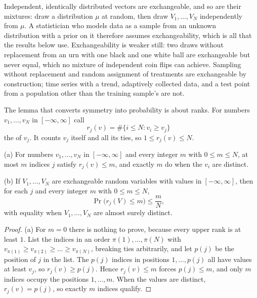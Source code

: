 \begin{refsection}
Independent, identically distributed vectors are exchangeable, and so are their mixtures: draw a distribution $\mu$ at random, then draw $V_1,\dots,V_N$ independently from $\mu$. A statistician who models data as a sample from an unknown distribution with a prior on it therefore assumes exchangeability, which is all that the results below use. Exchangeability is weaker still: two draws without replacement from an urn with one black and one white ball are exchangeable but never equal, which no mixture of independent coin flips can achieve. Sampling without replacement and random assignment of treatments are exchangeable by construction; time series with a trend, adaptively collected data, and a test point from a population other than the training sample's are not.

The lemma that converts symmetry into probability is about ranks. For numbers $v_1,\dots,v_N$ in $[-\infty,\infty]$ call
\[
r_j(v)=\#\{i\le N : v_i\ge v_j\}
\]
the  of $v_j$. It counts $v_j$ itself and all its ties, so $1\le r_j(v)\le N$.

\begin{lemma}\label{lem:conformal:rank}
\textup{(a)} For numbers $v_1,\dots,v_N$ in $[-\infty,\infty]$ and every integer $m$ with $0\le m\le N$, at most $m$ indices $j$ satisfy $r_j(v)\le m$, and exactly $m$ do when the $v_i$ are distinct.
\par\textup{(b)} If $V_1,\dots,V_N$ are exchangeable random variables with values in $[-\infty,\infty]$, then for each $j$ and every integer $m$ with $0\le m\le N$,
\[
\Pr\bigl(r_j(V)\le m\bigr)\le\frac{m}{N},
\]
with equality when $V_1,\dots,V_N$ are almost surely distinct.
\end{lemma}

\begin{proof}
(a) For $m=0$ there is nothing to prove, because every upper rank is at least $1$. List the indices in an order $\pi(1),\dots,\pi(N)$ with $v_{\pi(1)}\ge v_{\pi(2)}\ge\dots\ge v_{\pi(N)}$, breaking ties arbitrarily, and let $p(j)$ be the position of $j$ in the list. The $p(j)$ indices in positions $1,\dots,p(j)$ all have values at least $v_j$, so $r_j(v)\ge p(j)$. Hence $r_j(v)\le m$ forces $p(j)\le m$, and only $m$ indices occupy the positions $1,\dots,m$. When the values are distinct, $r_j(v)=p(j)$, so exactly $m$ indices qualify.


\end{proof}
\end{refsection}
